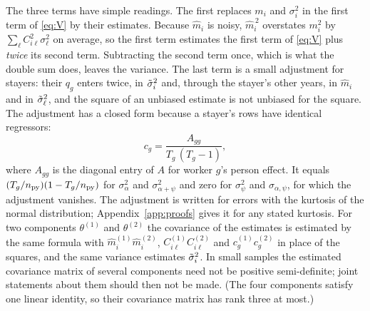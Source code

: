 The three terms have simple readings. The first replaces $m_i$ and $\sigma_i^2$ in the first term of
\eqref{eq:V} by their estimates. Because $\hat m_i$ is noisy, $\hat m_i^{\,2}$ overstates $m_i^2$ by
$\sum_\ell C_{i\ell}^2\sigma_\ell^2$ on average, so the first term estimates the first term of \eqref{eq:V}
plus \emph{twice} its second term. Subtracting the second term once, which is what the double sum does, leaves
the variance. The last term is a small adjustment for stayers: their $q_g$ enters twice, in $\tilde\sigma_i^2$ and,
through the stayer's other years, in $\hat m_i$ and in $\tilde\sigma_\ell^2$, and the square of an unbiased estimate is
not unbiased for the square. The adjustment has a closed form because a stayer's rows have identical
regressors:
\begin{equation}\label{eq:cg}
c_g=\frac{A_{gg}}{T_g\,(T_g-1)},
\end{equation}
where $A_{gg}$ is the diagonal entry of $A$ for worker $g$'s person effect. It equals
$(T_g/n_{\rm py})(1-T_g/n_{\rm py})$ for $\sigma^2_\alpha$ and $\sigma^2_{\alpha+\psi}$ and zero for $\sigma^2_\psi$
and $\sigma_{\alpha,\psi}$, for which the adjustment vanishes. The adjustment is written for errors with the
kurtosis of the normal distribution; Appendix~\ref{app:proofs} gives it for any stated kurtosis. For two
components $\theta^{(1)}$ and $\theta^{(2)}$ the covariance of the estimates is estimated by the same formula
with $\hat m_i^{(1)}\hat m_i^{(2)}$, $C^{(1)}_{i\ell}C^{(2)}_{i\ell}$ and $c^{(1)}_gc^{(2)}_g$ in place of the
squares, and the same variance estimates $\tilde\sigma_i^2$. In small samples the estimated covariance matrix of several
components need not be positive semi-definite; joint statements about them should then not be made. (The four components satisfy
one linear identity, so their covariance matrix has rank three at most.)

